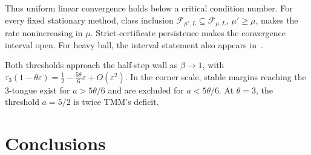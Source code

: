 \documentclass[11pt]{article}
\theoremstyle{definition}
\theoremstyle{remark}
\newcommand{\cF}{\mathcal F}
\begin{document}
Thus uniform linear convergence holds below a critical condition number.
For every fixed stationary method, class inclusion
\(\cF_{\mu',L}\subseteq\cF_{\mu,L}\), \(\mu'\ge\mu\), makes the rate nonincreasing in \(\mu\).
Strict-certificate persistence makes the convergence interval open.
For heavy ball, the interval statement also appears in~\cite[Theorem~3.12]{TA}.
%

Both thresholds approach the half-step wall as \(\beta\to1\), with
\(\tau_3(1-\theta\varepsilon)=\tfrac12-\tfrac{5\theta}{6}\varepsilon+O(\varepsilon^2)\).
In the corner scale, stable margins reaching the \(3\)-tongue exist for
\(a>5\theta/6\) and are excluded for \(a<5\theta/6\).
At \(\theta=3\), the threshold \(a=5/2\) is twice TMM's deficit.

%
\section{Conclusions}
\label{sec:conclusions}
%
\end{document}
